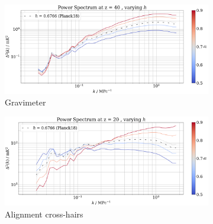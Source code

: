 \documentclass[floats,floatfix,showpacs,amssymb,prd,superscriptaddress,nofootinbib]{revtex4-2} %
\begin{document}
\begin{figure}[H]
     \centering
     \begin{subfigure}[b]{0.9\textwidth}
         \centering
         \includegraphics[width=\textwidth]{images/simulation_results/power_spectrum_fixed_z_40_h.png}
         \caption{Gravimeter}
         \label{fig:IC_Om1}
     \end{subfigure}
     \hfill
     \begin{subfigure}[b]{0.9\textwidth}
         \centering
         \includegraphics[width=\textwidth]{images/simulation_results/power_spectrum_fixed_z_20_h.png}
         \caption{Alignment cross-hairs}
         \label{fig:IC_Om5}
     \end{subfigure}
        \caption{}
        \label{fig:apparatus}
\end{figure}
\end{document}
